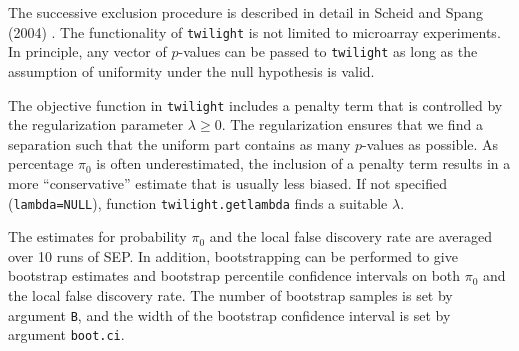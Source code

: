 \documentclass[11pt,a4paper,fleqn]{report}
\newcommand{\Rfunction}[1]{{\texttt{#1}}}
\newcommand{\Rfunarg}[1]{{\texttt{#1}}}
\begin{document}
The successive exclusion procedure is described in detail in Scheid and Spang (2004) \cite{scheid04}. The functionality of \Rfunction{twilight} is not limited to microarray experiments. In principle, any vector of $p$-values can be passed to \Rfunction{twilight} as long as the assumption of uniformity under the null hypothesis is valid.

The objective function in \Rfunction{twilight} includes a penalty term that is controlled by the regularization parameter $\lambda \geq 0$. The regularization ensures that we find a separation such that the uniform part contains as many $p$-values as possible. As percentage $\pi_0$ is often underestimated, the inclusion of a penalty term results in a more ``conservative'' estimate that is usually less biased. If not specified (\Rfunarg{lambda=NULL}), function \Rfunction{twilight.getlambda} finds a suitable $\lambda$.

The estimates for probability $\pi_0$ and the local false discovery rate are averaged over 10 runs of SEP. In addition, bootstrapping can be performed to give bootstrap estimates and bootstrap percentile confidence intervals on both $\pi_0$ and the local false discovery rate. The number of bootstrap samples is set by argument \Rfunarg{B}, and the width of the bootstrap confidence interval is set by argument \Rfunarg{boot.ci}.
\end{document}
